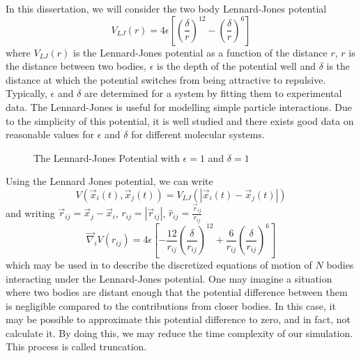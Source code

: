 %
In this dissertation, we will consider the two body Lennard-Jones potential
\begin{equation}
    V_{LJ}(r) = 4\epsilon \left[
        \left( \frac{\delta}{r} \right)^{12}
        - \left( \frac{\delta}{r} \right)^{6}
    \right]
\end  {equation}
where $V_{LJ}(r)$ is the Lennard-Jones potential as
a function of the distance $r$,
$r$ is the distance between two bodies,
$\epsilon$ is the depth of the potential well and
$\delta$ is the distance at which
the potential switches from being attractive to repulsive.
Typically, $\epsilon$ and $\delta$ are determined for a system by
fitting them to experimental data.
%
The Lennard-Jones is useful for modelling simple particle interactions.
%
Due to the simplicity of this potential,
it is well studied and there exists good data on
reasonable values for $\epsilon$ and $\delta$ for
different molecular systems.
%
\begin{figure}
    
    \caption{The Lennard-Jones Potential with $\epsilon = 1$ and $\delta = 1$}
\end  {figure}

%
Using the Lennard Jones potential, we can write
\begin{equation}
    V(\vec{x}_i(t), \vec{x}_j(t)) = V_{LJ}(|\vec{x}_i(t) - \vec{x}_j(t)|)
\end  {equation}
and writing $\vec{r}_{ij} = \vec{x}_j - \vec{x}_i$,
$r_{ij} = |\vec{r}_{ij}|$, $\hat{r}_{ij} = \frac{\vec{r}_{ij}}{r_{ij}}$
\begin{equation}
    \vec{\nabla}_i V(r_{ij}) = 4\epsilon \left[
        - \frac{12}{r_{ij}} \left( \frac{\delta}{r_{ij}} \right)^{12}
        + \frac{6}{r_{ij}} \left( \frac{\delta}{r_{ij}} \right)^{6}
    \right]
\end  {equation}
which may be used in  to describe
the discretized equations of motion of $N$ bodies interacting under the
Lennard-Jones potential.
%
One may imagine a situation where two bodies are distant enough
that the potential difference between them is negligible compared
to the contributions from closer bodies.
%
In this case, it may be possible to approximate this potential difference
to zero, and in fact, not calculate it.
%
By doing this, we may reduce the time complexity of our simulation.
%
This process is called truncation.



